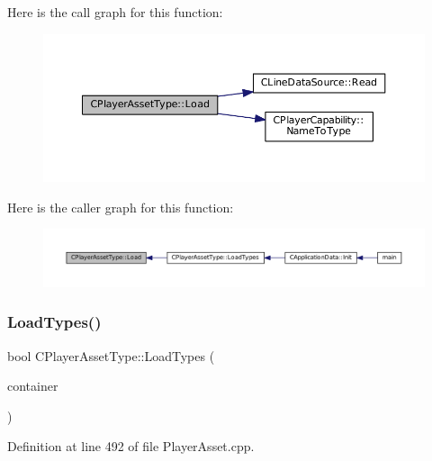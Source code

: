 Here is the call graph for this function\+:
\nopagebreak
\begin{figure}[H]
\begin{center}
\leavevmode
\includegraphics[width=350pt]{classCPlayerAssetType_a8e50738b1b451f4c870108777e6e3f90_cgraph}
\end{center}
\end{figure}
Here is the caller graph for this function\+:
\nopagebreak
\begin{figure}[H]
\begin{center}
\leavevmode
\includegraphics[width=350pt]{classCPlayerAssetType_a8e50738b1b451f4c870108777e6e3f90_icgraph}
\end{center}
\end{figure}
\hypertarget{classCPlayerAssetType_ad36348338ae4fea7e70450ef30c92a26}{}\label{classCPlayerAssetType_ad36348338ae4fea7e70450ef30c92a26} 
\subsubsection{\texorpdfstring{Load\+Types()}{LoadTypes()}}
{\footnotesize\ttfamily bool C\+Player\+Asset\+Type\+::\+Load\+Types (\begin{DoxyParamCaption}\item[{std\+::shared\+\_\+ptr$<$ \hyperlink{classCDataSourceContainer}{C\+Data\+Source\+Container} $>$}]{container }\end{DoxyParamCaption})\hspace{0.3cm}{\ttfamily [static]}}



Definition at line 492 of file Player\+Asset.\+cpp.



